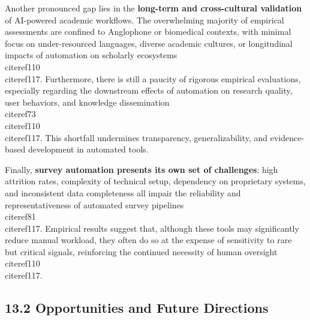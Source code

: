 \documentclass[11pt]{article}
\begin{document}
Another pronounced gap lies in the \textbf{long-term and cross-cultural validation} of AI-powered academic workflows. The overwhelming majority of empirical assessments are confined to Anglophone or biomedical contexts, with minimal focus on under-resourced languages, diverse academic cultures, or longitudinal impacts of automation on scholarly ecosystems \\cite{ref110}\\cite{ref117}. Furthermore, there is still a paucity of rigorous empirical evaluations, especially regarding the downstream effects of automation on research quality, user behaviors, and knowledge dissemination \\cite{ref73}\\cite{ref110}\\cite{ref117}. This shortfall undermines transparency, generalizability, and evidence-based development in automated tools.

Finally, \textbf{survey automation presents its own set of challenges}: high attrition rates, complexity of technical setup, dependency on proprietary systems, and inconsistent data completeness all impair the reliability and representativeness of automated survey pipelines \\cite{ref81}\\cite{ref117}. Empirical results suggest that, although these tools may significantly reduce manual workload, they often do so at the expense of sensitivity to rare but critical signals, reinforcing the continued necessity of human oversight \\cite{ref110}\\cite{ref117}.

\subsection{13.2 Opportunities and Future Directions}
\end{document}
